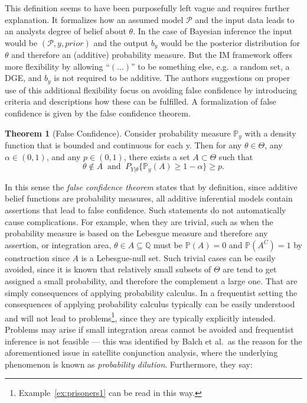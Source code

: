 \documentclass[
]{report}
\theoremstyle{definition}
\newtheorem{theorem}{Theorem}
\theoremstyle{definition}
\begin{document}
This definition seems to have been purposefully left vague and requires
further explanation. It formalizes how an assumed model \(\mathscr{P}\)
and the input data leads to an analysts degree of belief about
\(\theta\). In the case of Bayesian inference the input would be
\((\mathscr{P}, y, prior)\) and the output \(b_y\) would be the
posterior distribution for \(\theta\) and therefore an (additive)
probability measure. But the IM framework offers more flexibility by
allowing ``\((\dots)\)'' to be something else, e.g.~a random set, a DGE,
and \(b_y\) is not required to be additive. The authors suggestions on
proper use of this additional flexibility focus on avoiding false
confidence by introducing criteria and descriptions how these can be
fulfilled. A formalization of false confidence is given by the false
confidence theorem.

\begin{theorem}[False Confidence] Consider probability measure $\mathbb{P}_y$ with a density function that is bounded and continuous for each y. Then for any $\theta \in \Theta$, any $\alpha \in (0,1)$, and any $p \in (0,1)$, there exists a set $A \subset \Theta$ such that
$$\theta \notin A  \ \text{ and } \ P_{Y| \theta} \{\mathbb{P}_y (A) \geq 1 - \alpha \} \geq p.$$
\end{theorem}

In this sense the \textit{false confidence theorem} states that by
definition, since additive belief functions are probability measures,
all additive inferential models contain assertions that lead to false
confidence. Such statements do not automatically cause complications.
For example, when they are trivial, such as when the probability measure
is based on the Lebesgue measure and therefore any assertion, or
integration area, \(\theta \in A \subseteq \mathbb{Q}\) must be
\(\mathbb{P}(A) = 0\) and \(\mathbb{P}(A^C) = 1\) by construction since
\(A\) is a Lebesgue-null set. Such trivial cases can be easily avoided,
since it is known that relatively small subsets of \(\Theta\) are tend
to get assigned a small probability, and therefore the complement a
large one. That are simply consequences of applying probability
calculus. In a frequentist setting the consequences of applying
probability calculus typically can be easily understood and will not
lead to
problems\footnote{Example~\ref{ex:prisoners1} can be read in this way.},
since they are typically explicitly intended. Problems may arise if
small integration areas cannot be avoided and frequentist inference is
not feasible --- this was identified by Balch et al.~as the reason for
the aforementioned issue in satellite conjunction analysis, where the
underlying phenomenon is known as \textit{probability dilution}.
Furthermore, they say:
\end{document}
